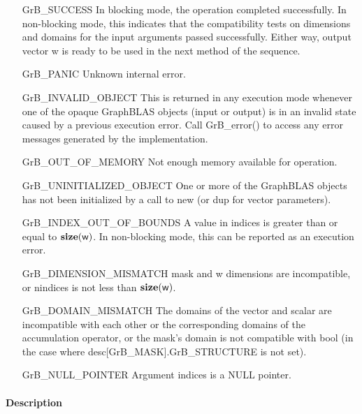 \begin{itemize}[leftmargin=2.3in]
    \item[{\sf GrB\_SUCCESS}]         In blocking mode, the operation completed
    successfully. In non-blocking mode, this indicates that the compatibility 
    tests on dimensions and domains for the input arguments passed successfully. 
    Either way, output vector {\sf w} is ready to be used in the next method of 
    the sequence.

    \item[{\sf GrB\_PANIC}]           Unknown internal error.

    \item[{\sf GrB\_INVALID\_OBJECT}] This is returned in any execution mode 
    whenever one of the opaque GraphBLAS objects (input or output) is in an invalid 
    state caused by a previous execution error.  Call {\sf GrB\_error()} to access 
    any error messages generated by the implementation.

    \item[{\sf GrB\_OUT\_OF\_MEMORY}] Not enough memory available for operation.

    \item[{\sf GrB\_UNINITIALIZED\_OBJECT}] One or more of the GraphBLAS objects
    has not been initialized by a call to {\sf new} (or {\sf dup} for vector
    parameters).

    \item[{\sf GrB\_INDEX\_OUT\_OF\_BOUNDS}]  A value in {\sf indices} is greater
    than or equal to $\bold{size}({\sf w})$.  In non-blocking mode, this can be
    reported as an execution error.

    \item[{\sf GrB\_DIMENSION\_MISMATCH}] {\sf mask} and {\sf w} dimensions are
    incompatible, or {\sf nindices} is not less than $\bold{size}({\sf w})$. 

    \item[{\sf GrB\_DOMAIN\_MISMATCH}]    The domains of the vector and scalar are
    incompatible with each other or the corresponding domains of the
    accumulation operator, or the mask's domain is not compatible with {\sf bool}
    (in the case where {\sf desc[GrB\_MASK].GrB\_STRUCTURE} is not set).

    \item[{\sf GrB\_NULL\_POINTER}] Argument {\sf indices} is a {\sf NULL} pointer.
\end{itemize}

\paragraph{Description}

